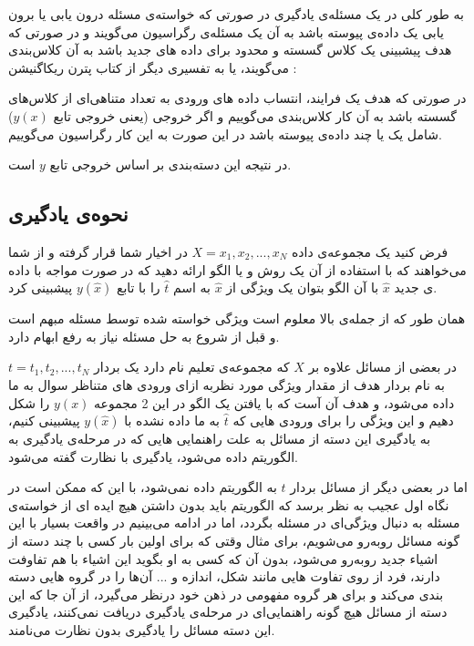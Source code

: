 \documentclass[11pt,a4paper,twocolumn]{article}
\begin{document}
به طور کلی در یک مسئله‌ی
یادگیری
در صورتی که خواسته‌ی مسئله 
درون یابی
یا 
برون یابی
یک داده‌ی پیوسته باشد به آن یک مسئله‌ی 
رگراسیون
می‌گویند و در صورتی که هدف پیشبینی یک کلاس گسسته‌ و محدود برای داده های جدید باشد به آن
کلاس‌بندی
می‌گویند، یا به تفسیری دیگر از کتاب پترن ریکاگنیشن :

در صورتی که هدف یک فرایند، انتساب داده های ورودی به تعداد متناهی‌ای از کلاس‌های گسسته باشد به آن کار کلاس‌بندی می‌گوییم و اگر خروجی (یعنی خروجی تابع ‌$y(x)$) شامل یک یا چند داده‌ی پیوسته باشد در این صورت به این کار رگراسیون می‌گوییم.\cite{bishop}

در نتیجه این دسته‌بندی بر اساس خروجی تابع $y$ است.
\subsection{نحوه‌ی یادگیری}
فرض کنید یک مجموعه‌ی داده
$X={ x_1, x_2, ... , x_N}$
در اخیار شما قرار گرفته و از شما می‌خواهند که  با استفاده از آن یک روش و یا الگو ارائه دهید که در صورت مواجه با داده ی جدید
$\widehat x$
با آن الگو بتوان یک ویژگی از
$\widehat x$
به اسم
$\widehat t$
را با تابع
$y(\widehat x)$
پیشبینی کرد.

همان طور که از جمله‌ی بالا معلوم است ویژگی خواسته‌ شده توسط مسئله مبهم است و قبل از شروع به حل مسئله نیاز به رفع ابهام دارد.

در بعضی از مسائل علاوه بر
$X$
که مجموعه‌ی تعلیم
نام دارد یک بردار
$t = { t_1, t_2 ,..., t_N }$
به نام بردار هدف
از مقدار ویژگی مورد نظربه ازای ورودی های متناظر سوال به ما داده می‌شود، و هدف آن آست که با یافتن یک الگو در این 2 مجموعه $y(x)$ را شکل دهیم و این ویژگی را برای ورودی هایی که
$\widehat t$
به ما داده نشده با
$y(\widehat x)$ 
پیشبینی کنیم، به یادگیری این دسته از مسائل به علت راهنمایی هایی که در مرحله‌ی یادگیری به الگوریتم داده می‌شود،
یادگیری با نظارت
 گفته می‌شود.
 
 اما در بعضی دیگر از مسائل بردار $t$ به الگوریتم داده نمی‌شود، با این که ممکن است در نگاه اول عجیب به نظر برسد که الگوریتم باید بدون داشتن هیچ ایده ای از خواسته‌ی مسئله به دنبال ویژگی‌ای در مسئله بگردد، اما در ادامه می‌بینیم در واقعت بسیار با این گونه مسائل رو‌به‌رو می‌شویم، برای مثال وقتی که برای اولین بار کسی با چند دسته از اشیاء جدید روبه‌رو می‌شود، بدون آن که کسی به او بگوید این اشیاء با هم تفاوفت دارند، فرد  از روی تفاوت هایی مانند شکل، اندازه و ... آن‌ها را در گروه هایی دسته بندی می‌کند و برای هر گروه مفهومی در ذهن خود درنظر می‌گیرد، از آن جا که این دسته از مسائل هیچ گونه راهنمایی‌ای در مرحله‌ی یادگیری دریافت نمی‌کنند، یادگیری این دسته مسائل را یادگیری بدون نظارت می‌نامند.
\end{document}
